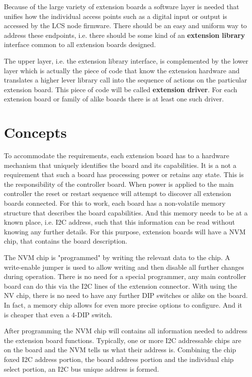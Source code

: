 Because of the large variety of extension boards a software layer is needed that unifies how the individual access points such as a digital input or output is accessed by the LCS node firmware. There should be an easy and uniform way to address these endpoints, i.e. there should be some kind of an \textbf{extension library} interface common to all extension boards designed.

The upper layer, i.e. the extension library interface, is complemented by the lower layer which is actually the piece of code that know the extension hardware and translates a higher lever library call into the sequence of actions on the particular extension board. This piece of code will be called \textbf{extension driver}. For each extension board or family of alike boards there is at least one such driver.

\section{Concepts}

To accommodate the requirements, each extension board has to a hardware mechanism that uniquely identifies the board and its capabilities. It is a not a requirement that such a board has processing power or retains any state. This is the responsibility of the controller board. When power is applied to the main controller the reset or restart sequence will attempt to discover all extension boards connected. For this to work, each board has a non-volatile memory structure that describes the board capabilities. And this memory needs to be at a known place, i.e. I2C address, such that this information can be read without knowing any further details. For this purpose, extension boards will have a NVM chip, that contains the board description.

The NVM chip is "programmed" by writing the relevant data to the chip. A write-enable jumper is used to allow writing and then disable all further changes during operation. There is no need for a special programmer, any main controller board can do this via the I2C lines of the extension connector. With using the NV chip, there is no need to have any further DIP switches or alike on the board. In fact, a memory chip allows for even more precise options to configure. And it is cheaper that even a 4-DIP switch.

After programming the NVM chip will contains all information needed to address the extension board functions. Typically, one or more I2C addressable chips are on the board and the NVM tells us what their address is. Combining the chip foxed I2C address portion, the board address portion and the individual chip select portion, an I2C bus unique address is formed. 

